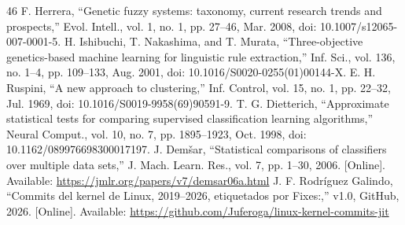 \begin{thebibliography}{46}
 F. Herrera, ``Genetic fuzzy systems: taxonomy, current research trends and prospects,'' Evol. Intell., vol. 1, no. 1, pp. 27--46, Mar. 2008, doi: \mbox{10.1007/s12065-007-0001-5}.
 H. Ishibuchi, T. Nakashima, and T. Murata, ``Three-objective genetics-based machine learning for linguistic rule extraction,'' Inf. Sci., vol. 136, no. 1--4, pp. 109--133, Aug. 2001, doi: \mbox{10.1016/S0020-0255(01)00144-X}.
 E. H. Ruspini, ``A new approach to clustering,'' Inf. Control, vol. 15, no. 1, pp. 22--32, Jul. 1969, doi: \mbox{10.1016/S0019-9958(69)90591-9}.
 T. G. Dietterich, ``Approximate statistical tests for comparing supervised classification learning algorithms,'' Neural Comput., vol. 10, no. 7, pp. 1895--1923, Oct. 1998, doi: \mbox{10.1162/089976698300017197}.
 J. Demšar, ``Statistical comparisons of classifiers over multiple data sets,'' J. Mach. Learn. Res., vol. 7, pp. 1--30, 2006. [Online]. Available: \url{https://jmlr.org/papers/v7/demsar06a.html}
 J. F. Rodr\'iguez Galindo, ``Commits del kernel de Linux, 2019--2026, etiquetados por Fixes:,'' v1.0, GitHub, 2026. [Online]. Available: \url{https://github.com/Juferoga/linux-kernel-commits-jit}
\end{thebibliography}
